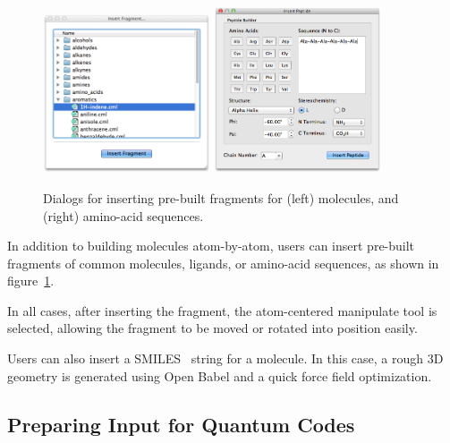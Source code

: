 \documentclass[10pt]{bmc_article}
\newenvironment{bmcformat}{\begin{raggedright}
\baselineskip20pt\sloppy\setboolean{publ}{false}}{\end{raggedright}
\baselineskip20pt\sloppy}
\begin{document}
\begin{bmcformat}
\begin{figure}
  \includegraphics[width=0.44\textwidth]{images/insert-fragment}
  \hspace{0.1cm}
  \includegraphics[width=0.44\textwidth]{images/insert-peptide}
  \caption{Dialogs for inserting pre-built fragments for (left)
    molecules, and (right) amino-acid sequences.}
  \label{f:insertdialogs}
\end{figure}

In addition to building molecules atom-by-atom, users can insert
pre-built fragments of common molecules, ligands, or amino-acid
sequences, as shown in figure~\ref{f:insertdialogs}.

In all cases, after inserting the fragment, the atom-centered manipulate tool
is selected, allowing the fragment to be moved or rotated into
position easily.

Users can also insert a SMILES~\cite{smiles}\cite{opensmiles} string for a molecule. In
this case, a rough 3D geometry is generated using Open Babel and a
quick force field optimization.

\subsection{Preparing Input for Quantum Codes}


\end{bmcformat}
\end{document}
